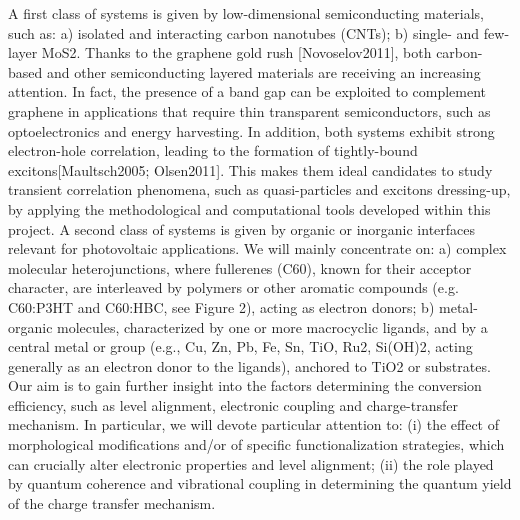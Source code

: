A first class of systems is given by low-dimensional semiconducting materials, such as: a) isolated and interacting carbon nanotubes (CNTs); b) single- and few-layer MoS2. Thanks to the graphene gold rush [Novoselov2011], both carbon-based and other semiconducting layered materials are receiving an increasing attention. In fact, the presence of a band gap can be exploited to complement graphene in applications that require thin transparent semiconductors, such as optoelectronics and energy harvesting. In addition, both systems exhibit strong electron-hole correlation, leading to the formation of tightly-bound excitons[Maultsch2005; Olsen2011]. This makes them ideal candidates to study transient correlation phenomena, such as quasi-particles and excitons dressing-up, by applying the methodological and computational tools developed within this project. 
A second  class of systems is given by organic or inorganic interfaces relevant for photovoltaic applications. We will mainly concentrate on: a) complex molecular heterojunctions, where fullerenes (C60), known for their acceptor character, are interleaved by polymers or other aromatic compounds (e.g. C60:P3HT and C60:HBC, see Figure 2), acting as electron donors; b) metal-organic molecules, characterized by one or more macrocyclic ligands, and by a central metal or group (e.g., Cu, Zn, Pb, Fe, Sn, TiO, Ru2, Si(OH)2, acting generally as an electron donor to the ligands), anchored to TiO2 or substrates. Our aim is to gain further insight into the factors determining the conversion efficiency, such as level alignment, electronic coupling and charge-transfer mechanism. In particular, we will devote particular attention to: (i) the effect of morphological modifications and/or of specific functionalization strategies, which can crucially alter electronic properties and level alignment; (ii) the role played by quantum coherence and vibrational coupling in determining the quantum yield of the charge transfer mechanism.

